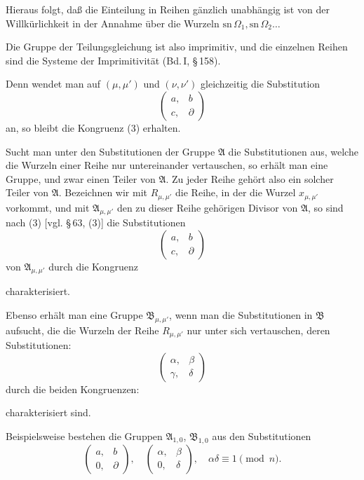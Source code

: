 Hieraus folgt, daß die Einteilung in Reihen gänzlich unabhängig
ist von der Willkürlichkeit in der Annahme über die
Wurzeln $\mathrm{sn}\,\Omega_1, \mathrm{sn}\,\Omega_2 \ldots$

Die Gruppe der Teilungsgleichung ist also imprimitiv, und die
einzelnen Reihen sind die Systeme der Imprimitivität (Bd.\,I, \S\,158).

Denn wendet man auf $(\mu,\mu')$ und $(\nu,\nu')$ gleichzeitig die
Substitution
\[
\begin{pmatrix} a, & b\\ c, & \partial \end{pmatrix}
\]
an, so bleibt die Kongruenz (3) erhalten.

Sucht man unter den Substitutionen der Gruppe $\mathfrak{A}$ die Substitutionen
aus, welche die Wurzeln einer Reihe nur untereinander
vertauschen, so erhält man eine Gruppe, und zwar einen Teiler
von $\mathfrak{A}$. Zu jeder Reihe gehört also ein solcher Teiler von $\mathfrak{A}$.
Bezeichnen wir mit $R_{\mu,\mu'}$ die Reihe, in der die Wurzel $x_{\mu,\mu'}$ vorkommt,
und mit $\mathfrak{A}_{\mu,\mu'}$ den zu dieser Reihe gehörigen Divisor von $\mathfrak{A}$,
so sind nach (3) [vgl. \S\,63, (3)] die Substitutionen
\[
\begin{pmatrix} a, & b\\ c, & \partial \end{pmatrix}
\]
von $\mathfrak{A}_{\mu,\mu'}$ durch die Kongruenz

charakterisiert.

Ebenso erhält man eine Gruppe $\mathfrak{B}_{\mu,\mu'}$, wenn man die Substitutionen
in $\mathfrak{B}$ aufsucht, die die Wurzeln der Reihe $R_{\mu,\mu'}$ nur
unter sich vertauschen, deren Substitutionen:
\[
\begin{pmatrix} \alpha, & \beta\\ \gamma, & \delta \end{pmatrix}
\]
durch die beiden Kongruenzen:

charakterisiert sind.

Beispielsweise bestehen die Gruppen $\mathfrak{A}_{1,0}$, $\mathfrak{B}_{1,0}$ aus den Substitutionen
\[
\begin{pmatrix} a, & b\\ 0, & \partial \end{pmatrix}, \quad
\begin{pmatrix} \alpha, & \beta\\ 0, & \delta \end{pmatrix}, \quad \alpha\delta \equiv 1 \pmod{n}.
\]
